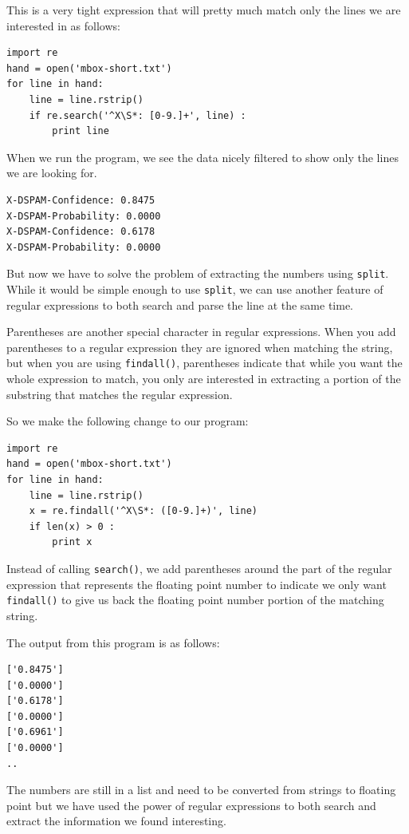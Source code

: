 \documentclass[10pt]{book}
\begin{document}
This is a very tight expression that will pretty much match only the lines we are interested in as follows:

\beforeverb
\begin{verbatim}
import re
hand = open('mbox-short.txt')
for line in hand:
    line = line.rstrip()
    if re.search('^X\S*: [0-9.]+', line) :
        print line
\end{verbatim}
\afterverb
%
When we run the program, we see the data nicely filtered to show 
only the lines we are looking for.

\beforeverb
\begin{verbatim}
X-DSPAM-Confidence: 0.8475
X-DSPAM-Probability: 0.0000
X-DSPAM-Confidence: 0.6178
X-DSPAM-Probability: 0.0000
\end{verbatim}
\afterverb
%
But now we have to solve the problem of extracting the numbers using {\tt split}.  While it would be simple enough to use {\tt split}, we can use another feature of regular expressions to both search and parse the line at the same time.

Parentheses are another special character in regular expressions.  When you add parentheses to a regular expression they are ignored when matching the string, but when you are using {\tt findall()}, parentheses indicate that while you want the whole expression to match, you only are interested in extracting a portion of the substring that matches the regular expression.  

So we make the following change to our program:

\beforeverb
\begin{verbatim}
import re
hand = open('mbox-short.txt')
for line in hand:
    line = line.rstrip()
    x = re.findall('^X\S*: ([0-9.]+)', line)
    if len(x) > 0 :
        print x
\end{verbatim}
\afterverb
%
Instead of calling {\tt search()}, we add parentheses around the part of the regular expression that represents the floating point number to indicate we only want {\tt findall()} to give us back the floating point number portion of the matching string.

The output from this program is as follows:

\beforeverb
\begin{verbatim}
['0.8475']
['0.0000']
['0.6178']
['0.0000']
['0.6961']
['0.0000']
..
\end{verbatim}
\afterverb
%
The numbers are still in a list and need to be converted from strings to floating point but we have used the power of regular expressions to both search and extract the information we found interesting.
\end{document}
